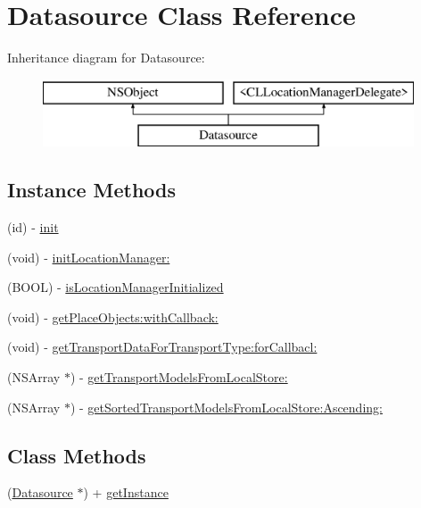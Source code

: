 \hypertarget{interface_datasource}{}\section{Datasource Class Reference}
\label{interface_datasource}
Inheritance diagram for Datasource\+:\begin{figure}[H]
\begin{center}
\leavevmode
\includegraphics[height=2.000000cm]{interface_datasource}
\end{center}
\end{figure}
\subsection*{Instance Methods}
\begin{DoxyCompactItemize}
\item 
(id) -\/ \hyperlink{interface_datasource_ac523e4cdc13430a1ab68e0525ccaef79}{init}
\item 
(void) -\/ \hyperlink{interface_datasource_ac3c15b8e842a6700d62ea7def496038b}{init\+Location\+Manager\+:}
\item 
(B\+O\+OL) -\/ \hyperlink{interface_datasource_adf2c40655c8b7b5d93478ea9f5c76091}{is\+Location\+Manager\+Initialized}
\item 
(void) -\/ \hyperlink{interface_datasource_a86113ddacf8e85d6f76ba872b85c6902}{get\+Place\+Objects\+:with\+Callback\+:}
\item 
(void) -\/ \hyperlink{interface_datasource_ae859d7559a81b9aec7dddc41acd07809}{get\+Transport\+Data\+For\+Transport\+Type\+:for\+Callbacl\+:}
\item 
(N\+S\+Array $\ast$) -\/ \hyperlink{interface_datasource_af9b552f35567d99cb2db5b7984937737}{get\+Transport\+Models\+From\+Local\+Store\+:}
\item 
(N\+S\+Array $\ast$) -\/ \hyperlink{interface_datasource_a5f02aea01c5a3faf9f57cd4ec991df55}{get\+Sorted\+Transport\+Models\+From\+Local\+Store\+:\+Ascending\+:}
\end{DoxyCompactItemize}
\subsection*{Class Methods}
\begin{DoxyCompactItemize}
\item 
(\hyperlink{interface_datasource}{Datasource} $\ast$) + \hyperlink{interface_datasource_a661d0b75643bedaaae990ebc22a2f78a}{get\+Instance}
\end{DoxyCompactItemize}
